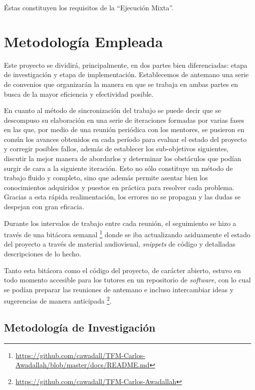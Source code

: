 Éstas constituyen los requisitos de la ``Ejecución Mixta''.

\section{Metodología Empleada}

Este proyecto se dividirá, principalmente, en dos partes bien diferenciadas: etapa de investigación y etapa de implementación. Establecemos de antemano una serie de convenios que organizarán la manera en que se trabaja en ambas partes en busca de la mayor eficiencia y efectividad posible.

En cuanto al método de sincronización del trabajo se puede decir que se descompuso su elaboración en una serie de iteraciones formadas por varias fases en las que, por medio de una reunión periódica con los mentores, se pusieron en común los avances obtenidos en cada período para evaluar el estado del proyecto y corregir posibles fallos, además de establecer los sub-objetivos siguientes, discutir la mejor manera de abordarlos y determinar los obstáculos que podían surgir de cara a la siguiente iteración. Esto no sólo constituye un método de trabajo fluido y completo, sino que además permite asentar bien los conocimientos adquiridos y puestos en práctica para resolver cada problema. Gracias a esta rápida realimentación, los errores no se propagan y las dudas se despejan con gran eficacia.

Durante los intervalos de trabajo entre cada reunión, el seguimiento se hizo a través de una bitácora semanal \footnote{\url{https://github.com/cawadall/TFM-Carlos-Awadallah/blob/master/docs/README.md}} donde se iba actualizando asiduamente el estado del proyecto a través de material audiovisual, \textit{snippets} de código y detalladas descripciones de lo hecho.

Tanto esta bitácora como el código del proyecto, de carácter abierto, estuvo en todo momento accesible para los tutores en un repositorio de \textit{software}, con lo cual se podían preparar las reuniones de antemano e incluso intercambiar ideas y sugerencias de manera anticipada \footnote{\url{https://github.com/cawadall/TFM-Carlos-Awadallah}}.

\subsection{Metodología de Investigación}

